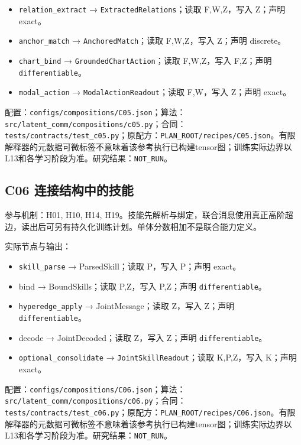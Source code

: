 \documentclass[
  10pt,
]{article}
\begin{document}
\begin{itemize}
\item
  \nolinkurl{relation_extract} → \nolinkurl{ExtractedRelations}；读取
  F,W,Z，写入 Z；声明 exact。
\item
  \nolinkurl{anchor_match} → \nolinkurl{AnchoredMatch}；读取 F,W,Z，写入
  Z；声明 discrete。
\item
  \nolinkurl{chart_bind} → \nolinkurl{GroundedChartAction}；读取
  F,W,Z，写入 F,Z；声明 \nolinkurl{differentiable}。
\item
  \nolinkurl{modal_action} → \nolinkurl{ModalActionReadout}；读取
  F,W，写入 Z；声明 exact。
\end{itemize}

配置：{\small\nolinkurl{configs/compositions/C05.json}}；算法：{\small\nolinkurl{src/latent_comm/compositions/c05.py}}；合同：{\small\nolinkurl{tests/contracts/test_c05.py}}；原配方：{\small\nolinkurl{PLAN_ROOT/recipes/C05.json}}。有限解释器的元数据可微标签不意味着该参考执行已构建tensor图；训练实际边界以L13和各学习阶段为准。研究结果：\nolinkurl{NOT_RUN}。

\subsection{C06
连接结构中的技能}\label{c06-ux8fdeux63a5ux7ed3ux6784ux4e2dux7684ux6280ux80fd}

参与机制：H01, H10, H14,
H19。技能先解析与绑定，联合消息使用真正高阶超边，读出后可另有持久化训练计划。单体分数相加不是联合能力定义。

实际节点与输出：

\begin{itemize}
\item
  \nolinkurl{skill_parse} → ParsedSkill；读取 P，写入 P；声明 exact。
\item
  bind → BoundSkills；读取 P,Z，写入 P,Z；声明
  \nolinkurl{differentiable}。
\item
  \nolinkurl{hyperedge_apply} → JointMessage；读取 Z，写入 Z；声明
  \nolinkurl{differentiable}。
\item
  decode → JointDecoded；读取 Z，写入 Z；声明
  \nolinkurl{differentiable}。
\item
  \nolinkurl{optional_consolidate} → \nolinkurl{JointSkillReadout}；读取
  K,P,Z，写入 K；声明 exact。
\end{itemize}

配置：{\small\nolinkurl{configs/compositions/C06.json}}；算法：{\small\nolinkurl{src/latent_comm/compositions/c06.py}}；合同：{\small\nolinkurl{tests/contracts/test_c06.py}}；原配方：{\small\nolinkurl{PLAN_ROOT/recipes/C06.json}}。有限解释器的元数据可微标签不意味着该参考执行已构建tensor图；训练实际边界以L13和各学习阶段为准。研究结果：\nolinkurl{NOT_RUN}。
\end{document}
